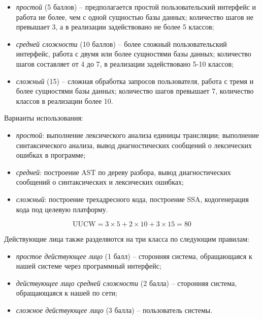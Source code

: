\documentclass[14pt,russian]{extarticle}
\begin{document}
\begin{itemize}
	\item \textit{простой} (5 баллов) – предполагается простой пользовательский интерфейс
		и работа не более, чем с одной сущностью базы данных; количество шагов не
		превышает 3, а в реализации задействовано не более 5 классов;

	\item \textit{средней сложности} (10 баллов) – более сложный пользовательский
		интерфейс, работа с двумя или более сущностями базы данных; количество шагов
		составляет от 4 до 7, в реализации задействовано 5-10 классов;

	\item \textit{сложный} (15) – сложная обработка запросов пользователя, работа с тремя и
		более сущностями базы данных; количество шагов превышает 7, количество
		классов в реализации более 10.
\end{itemize}

Варианты использования:

\begin{itemize}
	\item \textit{простой}: выполнение лексического анализа единицы трансляции;
		выполнение синтаксического анализа, вывод диагностических сообщений о
		лексических ошибках в программе;

	\item \textit{средней}: построение AST по дереву разбора, вывод
		диагностических сообщений о синтаксических и лексических ошибках;

	\item \textit{сложный}: построение трехадресного кода, построение SSA, кодогенерация
		кода под целевую платформу.
\end{itemize}

\begin{equation}
	\mathrm{UUCW} = 3 \times 5 + 2 \times 10 + 3 \times 15 = 80
\end{equation}

Действующие лица также разделяются на три класса по следующим правилам:

\begin{itemize}
	\item \textit{простое действующее лицо} (1 балл) – сторонняя система, обращающаяся к
		нашей системе через программный интерфейс;

	\item \textit{действующее лицо средней сложности} (2 балла) – сторонняя система,
		обращающаяся к нашей по сети;

	\item \textit{сложное действующее лицо} (3 балла) – пользователь системы.
\end{itemize}
\end{document}
